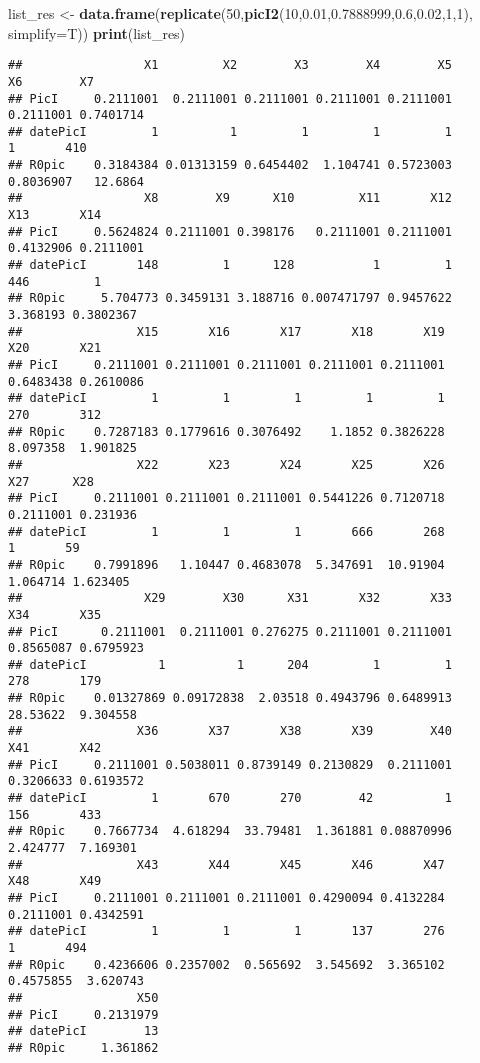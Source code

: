 \documentclass[
]{article}
\newenvironment{Shaded}{\begin{snugshade}}{\end{snugshade}}
\newcommand{\DataTypeTok}[1]{\textcolor[rgb]{0.13,0.29,0.53}{#1}}
\newcommand{\DecValTok}[1]{\textcolor[rgb]{0.00,0.00,0.81}{#1}}
\newcommand{\FloatTok}[1]{\textcolor[rgb]{0.00,0.00,0.81}{#1}}
\newcommand{\KeywordTok}[1]{\textcolor[rgb]{0.13,0.29,0.53}{\textbf{#1}}}
\newcommand{\NormalTok}[1]{#1}
\newcommand{\StringTok}[1]{\textcolor[rgb]{0.31,0.60,0.02}{#1}}
\begin{document}
\begin{Shaded}
\begin{Highlighting}[]
\NormalTok{list_res <-}\StringTok{ }\KeywordTok{data.frame}\NormalTok{(}\KeywordTok{replicate}\NormalTok{(}\DecValTok{50}\NormalTok{,}\KeywordTok{picI2}\NormalTok{(}\DecValTok{10}\NormalTok{,}\FloatTok{0.01}\NormalTok{,}\FloatTok{0.7888999}\NormalTok{,}\FloatTok{0.6}\NormalTok{,}\FloatTok{0.02}\NormalTok{,}\DecValTok{1}\NormalTok{,}\DecValTok{1}\NormalTok{), }\DataTypeTok{simplify=}\NormalTok{T))}
\KeywordTok{print}\NormalTok{(list_res)}
\end{Highlighting}
\end{Shaded}

\begin{verbatim}
##                 X1         X2        X3        X4        X5        X6        X7
## PicI     0.2111001  0.2111001 0.2111001 0.2111001 0.2111001 0.2111001 0.7401714
## datePicI         1          1         1         1         1         1       410
## R0pic    0.3184384 0.01313159 0.6454402  1.104741 0.5723003 0.8036907   12.6864
##                 X8        X9      X10         X11       X12       X13       X14
## PicI     0.5624824 0.2111001 0.398176   0.2111001 0.2111001 0.4132906 0.2111001
## datePicI       148         1      128           1         1       446         1
## R0pic     5.704773 0.3459131 3.188716 0.007471797 0.9457622  3.368193 0.3802367
##                X15       X16       X17       X18       X19       X20       X21
## PicI     0.2111001 0.2111001 0.2111001 0.2111001 0.2111001 0.6483438 0.2610086
## datePicI         1         1         1         1         1       270       312
## R0pic    0.7287183 0.1779616 0.3076492    1.1852 0.3826228  8.097358  1.901825
##                X22       X23       X24       X25       X26       X27      X28
## PicI     0.2111001 0.2111001 0.2111001 0.5441226 0.7120718 0.2111001 0.231936
## datePicI         1         1         1       666       268         1       59
## R0pic    0.7991896   1.10447 0.4683078  5.347691  10.91904  1.064714 1.623405
##                 X29        X30      X31       X32       X33       X34       X35
## PicI      0.2111001  0.2111001 0.276275 0.2111001 0.2111001 0.8565087 0.6795923
## datePicI          1          1      204         1         1       278       179
## R0pic    0.01327869 0.09172838  2.03518 0.4943796 0.6489913  28.53622  9.304558
##                X36       X37       X38       X39        X40       X41       X42
## PicI     0.2111001 0.5038011 0.8739149 0.2130829  0.2111001 0.3206633 0.6193572
## datePicI         1       670       270        42          1       156       433
## R0pic    0.7667734  4.618294  33.79481  1.361881 0.08870996  2.424777  7.169301
##                X43       X44       X45       X46       X47       X48       X49
## PicI     0.2111001 0.2111001 0.2111001 0.4290094 0.4132284 0.2111001 0.4342591
## datePicI         1         1         1       137       276         1       494
## R0pic    0.4236606 0.2357002  0.565692  3.545692  3.365102 0.4575855  3.620743
##                X50
## PicI     0.2131979
## datePicI        13
## R0pic     1.361862
\end{verbatim}
\end{document}
